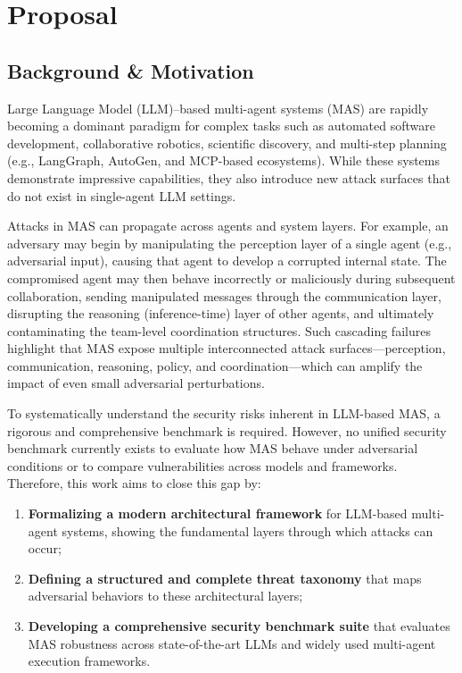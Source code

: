 \section{Proposal}
\subsection{Background \& Motivation}
Large Language Model (LLM)–based multi-agent systems (MAS) are rapidly becoming a dominant paradigm for complex tasks such as automated software development, collaborative robotics, scientific discovery, and multi-step planning (e.g., LangGraph, AutoGen, and MCP-based ecosystems). While these systems demonstrate impressive capabilities, they also introduce new attack surfaces that do not exist in single-agent LLM settings.

Attacks in MAS can propagate across agents and system layers. For example, an adversary may begin by manipulating the perception layer of a single agent (e.g., adversarial input), causing that agent to develop a corrupted internal state. The compromised agent may then behave incorrectly or maliciously during subsequent collaboration, sending manipulated messages through the communication layer, disrupting the reasoning (inference-time) layer of other agents, and ultimately contaminating the team-level coordination structures. Such cascading failures highlight that MAS expose multiple interconnected attack surfaces—perception, communication, reasoning, policy, and coordination—which can amplify the impact of even small adversarial perturbations.

To systematically understand the security risks inherent in LLM-based MAS, a rigorous and comprehensive benchmark is required. However, no unified security benchmark currently exists to evaluate how MAS behave under adversarial conditions or to compare vulnerabilities across models and frameworks. Therefore, this work aims to close this gap by:

\begin{enumerate}
\item \textbf{Formalizing a modern architectural framework} for LLM-based multi-agent systems, showing the fundamental layers through which attacks can occur;
\item \textbf{Defining a structured and complete threat taxonomy} that maps adversarial behaviors to these architectural layers;
\item \textbf{Developing a comprehensive security benchmark suite} that evaluates MAS robustness across state-of-the-art LLMs and widely used multi-agent execution frameworks.
\end{enumerate}

